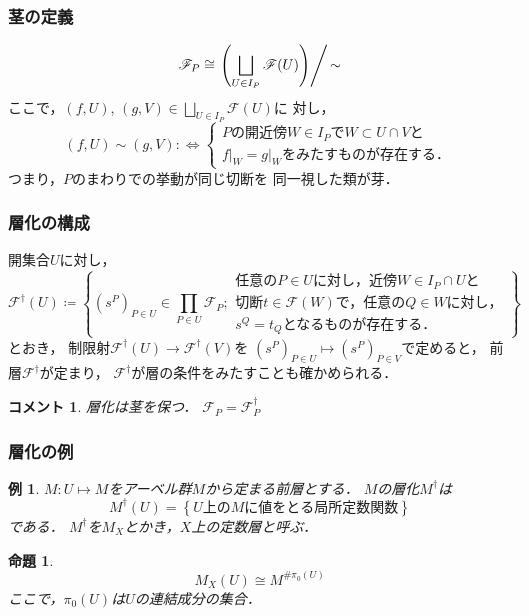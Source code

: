 \documentclass[dvipdfmx,12pt,aspectratio=169,leqno]{beamer}%
\numberwithin{equation}{subsection}
\theoremstyle{mystyle}
\newtheorem{PRP}[AXM]{命題}
\newtheorem{EG}[AXM]{例}
\newtheorem{CMT}[AXM]{コメント}
\begin{document}
\begin{frame}
    \frametitle{茎の定義}
    \[
        \mathscr{F}_{P}\cong
        \left.\left(
            \bigsqcup_{U\in I_P}\mathscr{F}(U)
        \right)\right/\mathop{\sim}
    \]
ここで，\((f,U)\), \((g,V)\in \bigsqcup_{U\in I_P}\mathscr{F}(U)\)に
対し，\[
    (f,U)\sim(g,V)
    \colon\Longleftrightarrow
    \begin{cases}
        \text{\(P\)の開近傍\(W\in I_P\)で\(W\subset U\cap V\)と}\\
        \text{\(f\rvert_W=g\rvert_W\)をみたすものが存在する．}
    \end{cases}
\]
つまり，\(P\)のまわりでの挙動が同じ切断を
同一視した類が芽．
\end{frame}


\begin{frame}
    \frametitle{層化の構成}

    開集合\(U\)に対し，
    \[
        \mathscr{F}^\dagger(U)\coloneqq
        \left\{
            (s^P)_{P\in U}\in\prod_{P\in U}^{}\mathscr{F}_P;
            \begin{aligned}
                \text{任意の\(P\in U\)に対し，近傍\(W\in I_P\cap U\)と}\\
                \text{切断\(t\in\mathscr{F}(W)\)で，任意の\(Q\in W\)に対し，}\\            
                \text{\(s^Q=t_Q\)となるものが存在する．}            
            \end{aligned}
        \right\}
    \]
    とおき，
    制限射\(\mathscr{F}^\dagger(U)\to\mathscr{F}^\dagger(V)\)を
    \((s^P)_{P\in U}\mapsto(s^P)_{P\in V}\)で定めると，
    前層\(\mathscr{F}^\dagger\)が定まり，
    \(\mathscr{F}^\dagger\)が層の条件をみたすことも確かめられる．

    \begin{CMT}層化は茎を保つ．
        \(\mathscr{F}_P=\mathscr{F}^\dagger_P\)
    \end{CMT}
    
\end{frame}

\begin{frame}
    \frametitle{層化の例}

    \begin{EG}
        \(M\colon U\mapsto M\)をアーベル群\(M\)から定まる前層とする．
        \(M\)の層化\(M^\dagger\)は\[
            M^\dagger(U)=\left\{
            \text{\(U\)上の\(M\)に値をとる局所定数関数}\right\}
        \]である．
        \(M^\dagger\)を\(M_X\)とかき，\(X\)上の定数層と呼ぶ．
    \end{EG}

    \begin{PRP}
        \[M_X(U)\cong M^{\# \pi_0(U)}\]
        ここで，\(\pi_0(U)\)は\(U\)の連結成分の集合．
    \end{PRP}

\end{frame}
\end{document}

